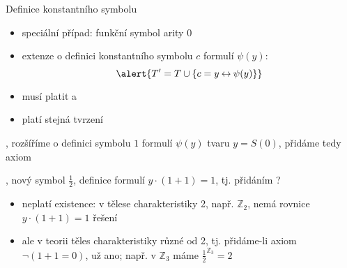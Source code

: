 \documentclass{beamer}
\begin{document}
\begin{frame}{Definice konstantního symbolu}
    
    \begin{itemize}
        \item \alert{speciální případ:} funkční symbol arity $0$
        \item extenze o definici konstantního symbolu $c$ formulí $\psi(y)$:
        $$
        \alert{T'=T\cup\{c=y\liff \psi(y)\}}
        $$
        \item musí platit  a 
        \item platí stejná tvrzení
    \end{itemize}

    , rozšíříme o definici symbolu $1$ formulí $\psi(y)$ tvaru \alert{$y=S(0)$}, přidáme tedy axiom 

    , nový symbol $\frac{1}{2}$, definice formulí \alert{$y\cdot (1+1)=1$}, tj. přidáním 
        ?
        \begin{itemize}
            \item {} neplatí existence: v tělese \alert{charakteristiky 2}, např. $\mathbb Z_2$, nemá rovnice $y\cdot (1+1)=1$ řešení
            \item ale v teorii těles \alert{charakteristiky různé od 2}, tj. přidáme-li axiom $\neg (1+1=0)$, už ano; např. v $\mathbb Z_3$ máme $\frac{1}{2}^{\mathbb Z_3}=2$
        \end{itemize}        

\end{frame}
\end{document}
